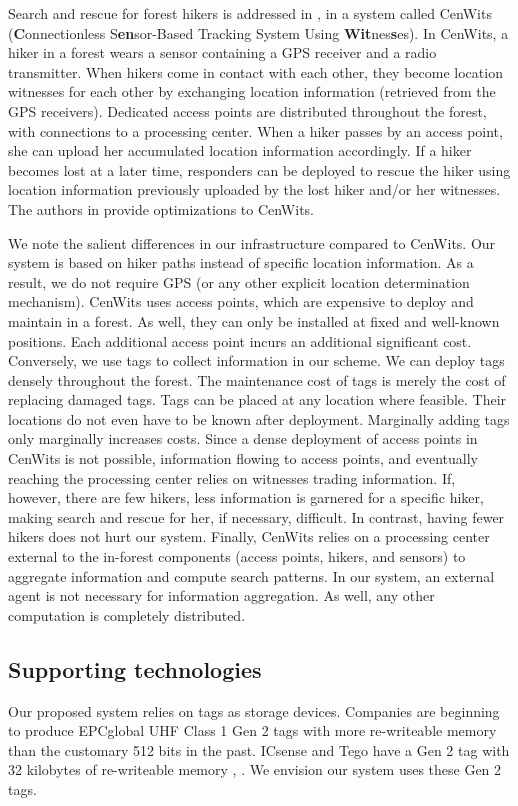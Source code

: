 \documentclass[conference]{IEEEtran}
\begin{document}
Search and rescue for forest hikers is addressed in \cite{conf:Huang01}, in a system called CenWits ({\bf C}onnectionless S{\bf en}sor-Based Tracking System Using {\bf Wit}nes{\bf s}es).  In CenWits, a hiker in a forest wears a sensor containing a GPS receiver and a radio transmitter.  When hikers come in contact with each other, they become location witnesses for each other by exchanging location information (retrieved from the GPS receivers).  Dedicated access points are distributed throughout the forest, with connections to a processing center.  When a hiker passes by an access point, she can upload her accumulated location information accordingly.  If a hiker becomes lost at a later time, responders can be deployed to rescue the hiker using location information previously uploaded by the lost hiker and/or her witnesses.  The authors in \cite{conf:Zhuang01} provide optimizations to CenWits.  

We note the salient differences in our infrastructure compared to CenWits.  Our system is based on hiker paths instead of specific location information.  As a result, we do not require GPS (or any other explicit location determination mechanism).  CenWits uses access points, which are expensive to deploy and maintain in a forest.  As well, they can only be installed at fixed and well-known positions.  Each additional access point incurs an additional significant cost.  Conversely, we use tags to collect information in our scheme.  We can deploy tags densely throughout the forest.  The maintenance cost of tags is merely the cost of replacing damaged tags.  Tags can be placed at any location where feasible.  Their locations do not even have to be known after deployment.  Marginally adding tags only marginally increases costs.  Since a dense deployment of access points in CenWits is not possible, information flowing to access points, and eventually reaching the processing center relies on witnesses trading information.  If, however, there are few hikers, less information is garnered for a specific hiker, making search and rescue for her, if necessary, difficult.  In contrast, having fewer hikers does not hurt our system.  Finally, CenWits relies on a processing center external to the in-forest components (access points, hikers, and sensors) to aggregate information and compute search patterns.  In our system, an external agent is not necessary for information aggregation.  As well, any other computation is completely distributed.

\subsection{Supporting technologies}
\label{subsec:supporting}
Our proposed system relies on tags as storage devices.  Companies are beginning to produce EPCglobal UHF Class 1 Gen 2 tags \cite{web:epcgen2uhf01}  with more re-writeable memory than the customary 512 bits in the past.  ICsense and Tego have a Gen 2 tag with 32 kilobytes of re-writeable memory \cite{web:icsense}, \cite{web:tego}.  We envision our system uses these Gen 2 tags.  
\end{document}
